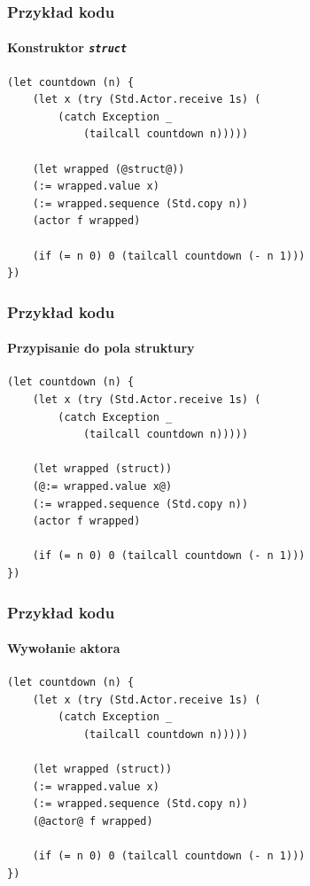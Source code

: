 \documentclass[aspectratio=169]{beamer}
\begin{document}
\begin{frame}[fragile]
    \frametitle{Przykład kodu}
    \framesubtitle{Konstruktor \emph{\texttt{struct}}}

    \begin{small}
    \begin{lstlisting}
(let countdown (n) {
    (let x (try (Std.Actor.receive 1s) (
        (catch Exception _
            (tailcall countdown n)))))

    (let wrapped (@struct@))
    (:= wrapped.value x)
    (:= wrapped.sequence (Std.copy n))
    (actor f wrapped)

    (if (= n 0) 0 (tailcall countdown (- n 1)))
})
    \end{lstlisting}
    \end{small}
\end{frame}

\begin{frame}[fragile]
    \frametitle{Przykład kodu}
    \framesubtitle{Przypisanie do pola struktury}

    \begin{small}
    \begin{lstlisting}
(let countdown (n) {
    (let x (try (Std.Actor.receive 1s) (
        (catch Exception _
            (tailcall countdown n)))))

    (let wrapped (struct))
    (@:= wrapped.value x@)
    (:= wrapped.sequence (Std.copy n))
    (actor f wrapped)

    (if (= n 0) 0 (tailcall countdown (- n 1)))
})
    \end{lstlisting}
    \end{small}
\end{frame}

\begin{frame}[fragile]
    \frametitle{Przykład kodu}
    \framesubtitle{Wywołanie aktora}

    \begin{small}
    \begin{lstlisting}
(let countdown (n) {
    (let x (try (Std.Actor.receive 1s) (
        (catch Exception _
            (tailcall countdown n)))))

    (let wrapped (struct))
    (:= wrapped.value x)
    (:= wrapped.sequence (Std.copy n))
    (@actor@ f wrapped)

    (if (= n 0) 0 (tailcall countdown (- n 1)))
})
    \end{lstlisting}
    \end{small}
\end{frame}
\end{document}
